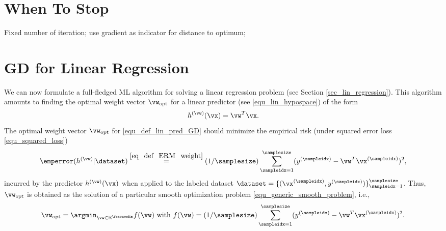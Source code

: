 \documentclass[12pt]{report}
\begin{document}
\section{When To Stop} 
Fixed number of iteration; use gradient as indicator for distance to optimum; 

\section{GD for Linear Regression} 
\label{sec_lin_reg}

We can now formulate a full-fledged ML algorithm for solving a linear regression problem (see Section \ref{sec_lin_regression}). 
This algorithm amounts to finding the optimal weight vector $\vw_{\rm opt}$ for a linear predictor (see \eqref{equ_lin_hypospace}) 
of the form 
\begin{equation} 
\label{equ_def_lin_pred_GD}
h^{(\vw)}(\vx) = \vw^{T} \vx.
\end{equation}
The optimal weight vector $\vw_{\rm opt}$ for \eqref{equ_def_lin_pred_GD} should minimize the empirical risk (under squared error loss \eqref{equ_squared_loss}) 
\begin{equation} 
\label{equ_def_cost_linreg}
\emperror(h^{(\vw)}| \dataset) \stackrel{\eqref{eq_def_ERM_weight}}{=} (1/\samplesize) \sum_{\sampleidx=1}^{\samplesize} (y^{(\sampleidx)} - \vw^{T} \vx^{(\sampleidx)})^{2}, 
\end{equation}
incurred by the predictor $h^{(\vw)}(\vx)$ when applied to the labeled dataset $\dataset=\{ (\vx^{(\sampleidx)}, y^{(\sampleidx)}) \}_{\sampleidx=1}^{\samplesize}$. 
Thus, $\vw_{\rm opt}$ is obtained as the solution of a particular smooth optimization problem \eqref{equ_generic_smooth_problem}, i.e., 
\begin{equation} 
\label{equ_smooth_problem_linreg}
\vw_{\rm opt} = \argmin_{\vw \in \mathbb{R}^{\featuredim}} f(\vw) \mbox{ with } f(\vw) = (1/\samplesize) \sum_{\sampleidx=1}^{\samplesize} (y^{(\sampleidx)} - \vw^{T} \vx^{(\sampleidx)})^{2}. 
\end{equation} 
\end{document}
